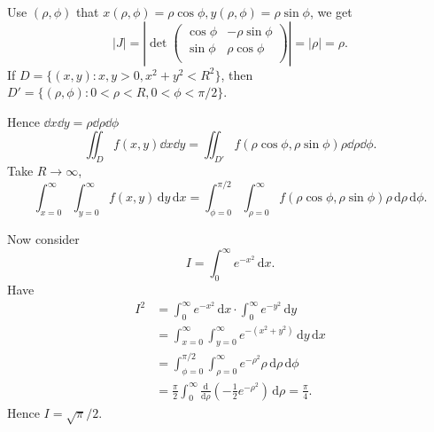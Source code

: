 \begin{example}
    Use $ (\rho,\phi) $ that $ x(\rho,\phi)=\rho \cos \phi,y(\rho,\phi)=\rho \sin \phi $, we get 
    \[
        |J| = \left| \det \begin{pmatrix}
            \cos \phi & -\rho \sin \phi \\
            \sin \phi & \rho \cos \phi \\
        \end{pmatrix} \right| = |\rho|=\rho.
    \]
    If $ D=\{(x,y):x,y>0, x^2+y^2<R^2\} $, then $ D'=\{(\rho,\phi):0<\rho<R,0<\phi<\pi/2\} $.
    \begin{center}
      \end{center}
      Hence $ \dd x\dd y=\rho\dd \rho\dd \phi $
      \[
          \iint_{D}f(x,y)\dd x\dd y = \iint_{D'}f(\rho \cos \phi,\rho \sin \phi)\rho \dd \rho\dd \phi.
      \]
      Take $ R\to \infty $,
      \[
          \int_{x=0}^{\infty} \int_{y=0}^{\infty} f(x,y) \,\mathrm{d}y \,\mathrm{d}x = \int_{\phi=0}^{\pi/2} \int_{\rho=0}^{\infty} f(\rho \cos \phi,\rho \sin \phi) \rho \,\mathrm{d}\rho \,\mathrm{d}\phi.
      \]

      Now consider 
      \[
          I = \int_{0}^{\infty} e^{-x^2} \,\mathrm{d}x.
      \]
      Have 
      \begin{align*}
          I^2 &= \int_{0}^{\infty} e^{-x^2} \,\mathrm{d}x \cdot \int_{0}^{\infty} e^{-y^2} \,\mathrm{d}y \\ 
          &= \int_{x=0}^{\infty} \int_{y=0}^{\infty} e^{-(x^2+y^2)} \,\mathrm{d}y \,\mathrm{d}x\\ 
          &= \int_{\phi=0}^{\pi/2} \int_{\rho=0}^{\infty} e^{-\rho^2} \rho \,\mathrm{d}\rho \,\mathrm{d}\phi \\
          &= \frac{\pi}{2} \int_{0}^{\infty} \frac{\mathrm{d}}{\mathrm{d}\rho}\left( -\frac{1}{2}e^{-\rho^2} \right)  \,\mathrm{d}\rho = \frac{\pi}{4}.
      \end{align*}
      Hence $ I=\sqrt{\pi}/2 $.
\end{example}